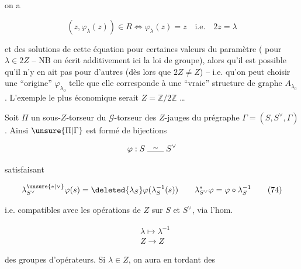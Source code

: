 on a

\[
(z,\varphi_\lambda(z))\in R\iff\varphi_\lambda(z)=z\quad\text{i.e.}\quad2z=\lambda \tag*{(73)}
\]

et   des solutions  de cette équation pour certaines valeurs du paramètre (  pour $\lambda\in2Z$ -- NB on écrit additivement ici la loi de groupe), alors qu'il est possible qu'il n'y en ait pas pour d'autres (dès lors que $2Z\ne Z$) -- i.e. qu'on peut  choisir une ``origine'' $\varphi_{\lambda_0}$ telle que elle  corresponde à une ``vraie'' structure de graphe $A_{\lambda_0}$. L'exemple le plus économique serait  $Z=\mathbb Z/2\mathbb Z$ \unsure{,} \ldots

Soit $\Pi$ un sous-$Z$-torseur du $\mathcal G$-torseur des $Z$-jauges du prégraphe $\Gamma=(S,S^\vee,\Gamma)$. Ainsi $\unsure{\Pi|\Gamma}$ est formé de bijections

\[
\varphi:S\mathrel{\overset{\sim}{\rule{2em}{0.35pt}}} S^\vee
\]

satisfaisant

\[
\lambda_{S^\vee}^{\unsure{*|\vee}}\varphi(s)=\deleted{\lambda_S}\varphi(\lambda_S^{-1}(s))
\qquad \lambda_{S^\vee}^{*}\varphi=\varphi\circ\lambda_S^{-1} \tag*{(74)}
\]

i.e. compatibles avec les opérations de $Z$ sur $S$ et $S^\vee$, via l'hom.

\[
\begin{aligned}
&\lambda\longmapsto\lambda^{-1}\\
&Z\longrightarrow Z
\end{aligned} \tag*{(75)}
\]

des groupes d'opérateurs.  Si $\lambda\in Z$, on aura en tordant  des  

